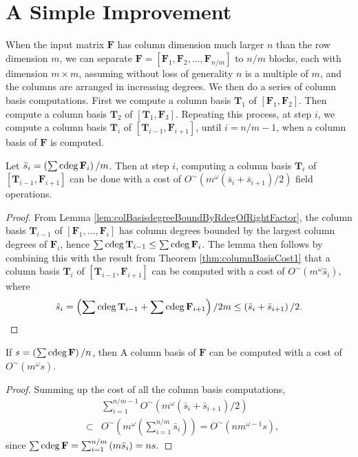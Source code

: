 
\section{\label{sec:successiveColBasisComputation}A Simple Improvement}

When the input matrix $\mathbf{F}$ has column dimension much larger
$n$ than the row dimension $m$, we can separate $\mathbf{F}=\left[\mathbf{F}_{1},\mathbf{F}_{2},\dots,\mathbf{F}_{n/m}\right]$
to $n/m$ blocks, each with dimension $m\times m$, assuming without
loss of generality $n$ is a multiple of $m$, and the columns are
arranged in increasing degrees. We then do a series of column basis
computations. First we compute a column basis $\mathbf{T}_{1}$ of
$\left[\mathbf{F}_{1},\mathbf{F}_{2}\right]$. Then compute a column
basis $\mathbf{T}_{2}$ of $\left[\mathbf{T}_{1},\mathbf{F}_{3}\right]$.
Repeating this process, at step $i$, we compute a column basis $\mathbf{T}_{i}$
of $\left[\mathbf{T}_{i-1},\mathbf{F}_{i+1}\right]$, until $i=n/m-1$,
when a column basis of $\mathbf{F}$ is computed. 
\begin{lem}
Let $\bar{s}_{i}=\left(\sum{\rm cdeg}\,\mathbf{F}_{i}\right)/m$. Then at
step $i$, computing a column basis $\mathbf{T}_{i}$ of $\left[\mathbf{T}_{i-1},\mathbf{F}_{i+1}\right]$
can be done with a cost of $O^{\sim}\left(m^{\omega}(\bar{s}_{i}+\bar{s}_{i+1})/2\right)$
field operations.\end{lem}
\begin{proof}
From Lemma \ref{lem:colBasisdegreeBoundByRdegOfRightFactor}, the
column basis $\mathbf{T}_{i-1}$ of $\left[\mathbf{F}_{1},\dots,\mathbf{F}_{i}\right]$
has column degrees bounded by the largest column degrees of $\mathbf{F}_{i}$,
hence $\sum{\rm cdeg}\,\mathbf{T}_{i-1}\le\sum{\rm cdeg}\,\mathbf{F}_{i}$. The
lemma then follows by combining this with the result from Theorem
\ref{thm:columnBasisCost1} that a column basis $\mathbf{T}_{i}$
of $\left[\mathbf{T}_{i-1},\mathbf{F}_{i+1}\right]$ can be computed
with a cost of $O^{\sim}\left(m^{\omega}\hat{s}_{i}\right)$, where
\[
\hat{s}_{i}=\left(\sum{\rm cdeg}\,\mathbf{T}_{i-1}+\sum{\rm cdeg}\,\mathbf{F}_{i+1}\right)/2m\le\left(\bar{s}_{i}+\bar{s}_{i+1}\right)/2.
\]
 \end{proof}
\begin{thm}
If $s=\left(\sum{\rm cdeg}\,\mathbf{F}\right)/n$, then \label{thm:finalCollBasisCost}A
column basis of $\mathbf{F}$ can be computed with a cost of $O^{\sim}\left(m^{\omega}s\right)$. \end{thm}
\begin{proof}
Summing up the cost of all the column basis computations, 
\begin{eqnarray*}
 &  & \sum_{i=1}^{n/m-1}O^{\sim}\left(m^{\omega}\left(\bar{s}_{i}+\bar{s}_{i+1}\right)/2\right)\\
 & \subset & O^{\sim}\left(m^{\omega}\left(\sum_{i=1}^{n/m}\bar{s}_{i}\right)\right)=O^{\sim}\left(nm^{\omega-1}s\right),
\end{eqnarray*}
 since $\sum{\rm cdeg}\,\mathbf{F}=\sum_{i=1}^{n/m}\left(m\bar{s}_{i}\right)=ns.$\end{proof}
